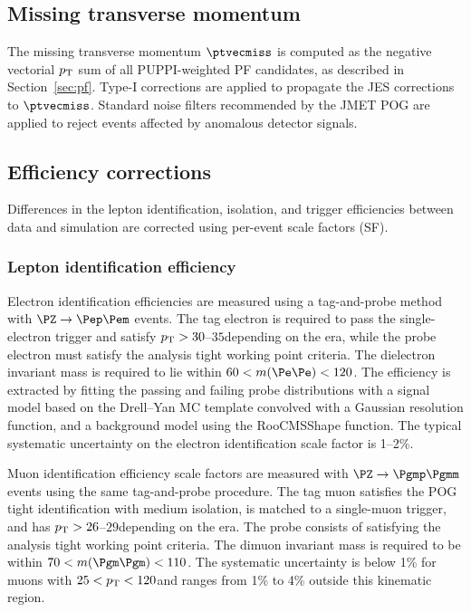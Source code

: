 \subsection{Missing transverse momentum}
\label{ssec:met}

The missing transverse momentum $\ptvecmiss$ is computed as the negative vectorial $p_{\mathrm{T}}$ sum of all PUPPI-weighted PF candidates, as described in Section~\ref{sec:pf}. Type-I corrections are applied to propagate the JES corrections to $\ptvecmiss$. Standard noise filters recommended by the JMET POG are applied to reject events affected by anomalous detector signals.

\subsection{Efficiency corrections}
\label{ssec:eff_corrections}

Differences in the lepton identification, isolation, and trigger efficiencies between data and simulation are corrected using per-event scale factors (SF).

\subsubsection*{Lepton identification efficiency}

Electron identification efficiencies are measured using a tag-and-probe method~\cite{CMS:2011aa} with $\PZ \to \Pep\Pem$ events. The tag electron is required to pass the single-electron trigger and satisfy $p_{\mathrm{T}} > 30$--$35$\GeV depending on the era, while the probe electron must satisfy the analysis tight working point criteria. The dielectron invariant mass is required to lie within $60 < m(\Pe\Pe) < 120$\GeV. The efficiency is extracted by fitting the passing and failing probe distributions with a signal model based on the Drell--Yan MC template convolved with a Gaussian resolution function, and a background model using the RooCMSShape function. The typical systematic uncertainty on the electron identification scale factor is 1--2\%.

Muon identification efficiency scale factors are measured with $\PZ \to \Pgmp\Pgmm$ events using the same tag-and-probe procedure. The tag muon satisfies the POG tight identification with medium isolation, is matched to a single-muon trigger, and has $p_{\mathrm{T}} > 26$--$29$\GeV depending on the era. The probe consists of satisfying the analysis tight working point criteria. The dimuon invariant mass is required to be within $70 < m(\Pgm\Pgm) < 110$\GeV. The systematic uncertainty is below 1\% for muons with $25 < p_{\mathrm{T}} < 120$\GeV and ranges from 1\% to 4\% outside this kinematic region.

